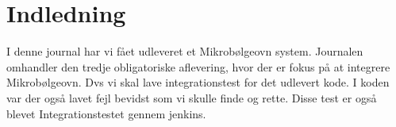 \section{Indledning}
I denne journal har vi fået udleveret et Mikrobølgeovn system. Journalen omhandler den tredje obligatoriske aflevering, hvor der er fokus på at integrere Mikrobølgeovn. Dvs vi skal lave integrationstest for det udlevert kode. I koden var der også lavet fejl bevidst som vi skulle finde og rette. Disse test er også blevet Integrationstestet gennem jenkins.